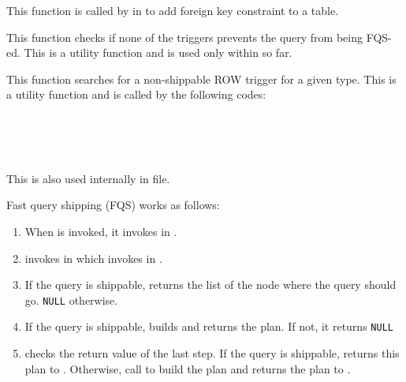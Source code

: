      This function is called by  in 
      to add foreign key constraint to a table.
  
  
      This function checks if none of the triggers prevents the query from being FQS-ed.
      This is a utility function and is used only within  so far.
  
  
      This function searches for a non-shippable ROW trigger for a given type.
      This is a utility function and is called by the following codes:
      
      \FuncRefHdr
		  \\ \vspace{3pt}
		  \\ \vspace{3pt}
		  \\ \hline
      \FuncRefTrailor
      
      This is also used internally in  file.
      
      Fast query shipping (FQS) works  as follows:
      
      \begin{enumerate}
		  \item When  is invoked, it invokes  in
				.
		  \item {} invokes  in 
		  		which invokes  in .
		  \item If the query is shippable,  returns the list
		  		of the node where the query should go.  \texttt{NULL} otherwise.
		  \item If the query is shippable,  builds and returns the plan.
		  		If not, it returns \texttt{NULL}
		  \item {} checks the return value of the last step.
		  		If the query is shippable, returns this plan to .
				Otherwise, call  to build the plan and returns the plan
      			to .
      \end{enumerate}


